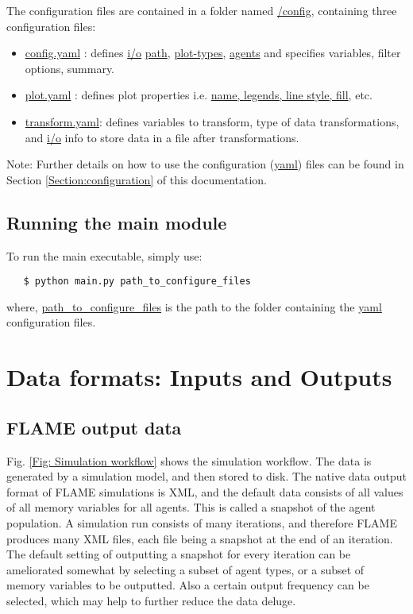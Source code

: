 \documentclass[10pt,a4paper]{article}
\begin{document}
The configuration files are contained in a folder named \url{/config}, containing three configuration files:
\begin{itemize}
\item \url{config.yaml} : defines \url{i/o} \url{path}, \url{plot-types}, \url{agents} and specifies variables, filter options, summary.

\item \url{plot.yaml} : defines plot properties i.e. \url{name, legends, line style, fill}, etc.

\item \url{transform.yaml}: defines variables to transform, type of data transformations, and \url{i/o} info to store data in a file after transformations.
\end{itemize}

Note: Further details on how to use the configuration (\url{yaml}) files can be found in Section \ref{Section:configuration} of this documentation.

\subsection{Running the main module}

To run the main executable, simply use:

\begin{lstlisting}
   $ python main.py path_to_configure_files
\end{lstlisting}

where, \url{path_to_configure_files} is the path to the folder containing the \url{yaml} configuration files.

\section{Data formats: Inputs and Outputs}
\label{Sec: Data formats}

\subsection{FLAME output data}
Fig. \ref{Fig: Simulation workflow} shows the simulation workflow. The data is generated by a simulation model, and then stored to disk. The native data output format of FLAME simulations is XML, and the default data consists of all values of all memory variables for all agents. This is called a snapshot of the agent population. A simulation run consists of many iterations, and therefore FLAME produces many XML files, each file being a snapshot at the end of an iteration. The default setting of outputting a snapshot for every iteration can be ameliorated somewhat by selecting a subset of agent types, or a subset of memory variables to be outputted. Also a certain output frequency can be selected, which may help to further reduce the data deluge.
\end{document}
